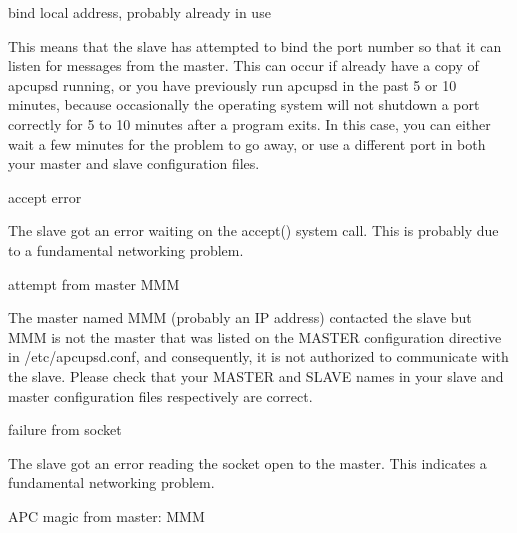 {{{{{{{{{{\smallCannot bind local address, probably already in use}

This means that the slave has attempted to bind the port number so that it can
listen for messages from the master. This can occur if already have a copy of
apcupsd running, or you have previously run apcupsd in the past 5 or 10
minutes, because occasionally the operating system will not shutdown a port
correctly for 5 to 10 minutes after a program exits. In this case, you can
either wait a few minutes for the problem to go away, or use a different port
in both your master and slave configuration files. 

\label{Socket-accept-error}

{\smallSocket accept error}

The slave got an error waiting on the accept() system call. This is probably
due to a fundamental networking problem. 

\label{Unauthorized-attempt-from-master-MMM}

{\smallUnauthorized attempt from master MMM}

The master named MMM (probably an IP address) contacted the slave but MMM is
not the master that was listed on the MASTER configuration directive in
/etc/apcupsd.conf, and consequently, it is not authorized to communicate with
the slave. Please check that your MASTER and SLAVE names in your slave and
master configuration files respectively are correct. 

\label{Read-failure-from-socket}

{\smallRead failure from socket}

The slave got an error reading the socket open to the master. This indicates a
fundamental networking problem. 

\label{Bad-APC-magic-from-master_003b-MMM}

{\smallBad APC magic from master: MMM}

}}}}}}}}}
